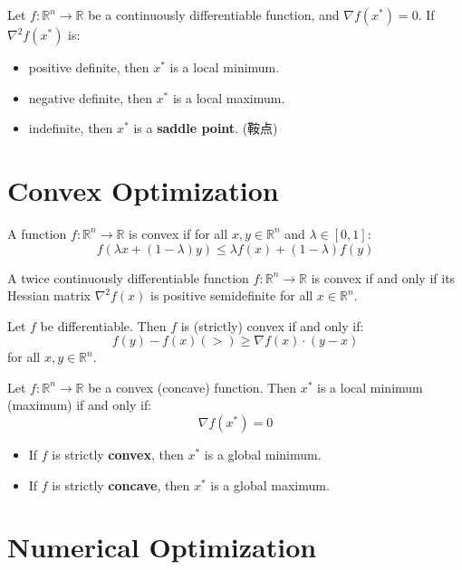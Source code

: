 \begin{proposition}
    Let $f: \mathbb{R}^n \to \mathbb{R}$ be a continuously differentiable function, and $\nabla f(x^*) = 0$. If $\nabla^2 f(x^*)$ is:
    \begin{itemize}
        \item positive definite, then $x^*$ is a local minimum.
        \item negative definite, then $x^*$ is a local maximum.
        \item indefinite, then $x^*$ is a \textbf{saddle point}. (鞍点)
    \end{itemize} 
\end{proposition}

\section{Convex Optimization}
\begin{definition}
    A function $f: \mathbb{R}^n \to \mathbb{R}$ is convex if for all $x, y \in \mathbb{R}^n$ and $\lambda \in [0, 1]$:
    $$f(\lambda x + (1 - \lambda) y) \leq \lambda f(x) + (1 - \lambda) f(y)$$
\end{definition}
\begin{theorem}
    A twice continuously differentiable function $f: \mathbb{R}^n \to \mathbb{R}$ is convex if and only if its Hessian matrix $\nabla^2 f(x)$ is positive semidefinite for all $x \in \mathbb{R}^n$.
\end{theorem}

\begin{proposition}
    Let $f$ be differentiable. Then $f$ is (strictly) convex if and only if:
    $$ f(y) - f(x) (>) \geq \nabla f(x) \cdot (y - x) $$
    for all $x, y \in \mathbb{R}^n$.
\end{proposition}
\begin{theorem}
    Let $f: \mathbb{R}^n \to \mathbb{R}$ be a convex (concave) function. Then $x^*$ is a local minimum (maximum) if and only if:
    $$\nabla f(x^*) = 0$$
    \begin{itemize}
        \item If $f$ is strictly \textbf{convex}, then $x^*$ is a global minimum.
        \item If $f$ is strictly \textbf{concave}, then $x^*$ is a global maximum.
    \end{itemize}
\end{theorem}
\section{Numerical Optimization}
